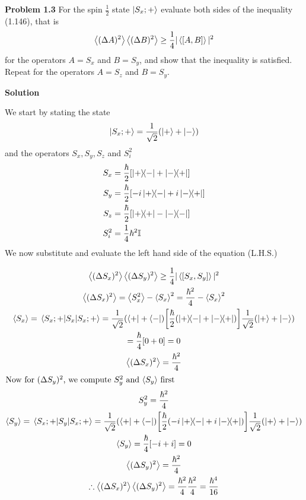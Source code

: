 \item \textbf{Problem 1.3}
For the spin $\frac12$ state $\ket{S_x;+}$ evaluate both sides of the inequality (1.146), that is
$$ \ev{(\Delta A)^2} \ev{(\Delta B)^2} \geq \frac14 |\ev{\comm{A}{B}}|^2$$
for the operators $A = S_x$ and $B = S_y$, and show that the inequality is satisfied. Repeat for the operators $A = S_z$ and $B = S_y$.

\vspace{1cm}
\textbf{Solution}

We start by stating the state $$\ket{S_x;+} = \frac{1}{\sqrt{2}} \qty(\ket + + \ket -)$$ and the operators $S_x,S_y,S_z$ and $S_i^2$
\begin{align*}
	S_x   & = \frac{\hbar}{2} \qty[\op{+}{-} + \ketbra{-}{+}]    \\
	S_y   & = \frac{\hbar}{2} \qty[-i\op{+}{-} + i\ketbra{-}{+}] \\
	S_z   & = \frac{\hbar}{2} \qty[\op{+}{+} - \ketbra{-}]       \\
	S_i^2 & = \frac14 \hbar^2\mathbb{I}
\end{align*}
We now substitute and evaluate the left hand side of the equation (L.H.S.)

\begin{gather*}
	\ev{(\Delta S_x)^2}\ev{(\Delta S_y)^2} \ge \frac{1}{4} | \ev{\comm{S_x}{S_y}} |^2\\
	\ev{(\Delta S_x)^2} = \ev{S_x^2} - \ev{S_x}^2 = \frac{\hbar^2}{4} - \ev{S_x}^2\\
	\ev{S_x} = \ev{S_x}{S_x;+} = \frac{1}{\sqrt{2}} \qty(\bra + + \bra -) \qty[\frac{\hbar}{2} \qty(\op{+}{-} + \ketbra{-}{+})]\frac{1}{\sqrt{2}} \qty(\ket + + \ket -)\\
	= \frac\hbar4 \qty[0 + 0] = 0\\
	\ev{(\Delta S_x)^2} = \frac{\hbar^2}{4}\\
	\intertext{Now for $(\Delta S_y)^2$, we compute $S_y^2$ and $\ev{S_y}$ first}
	S_y^2 = \frac{\hbar^2}{4}\\
	\ev{S_y} = \ev{S_y}{S_x;+} =  \frac{1}{\sqrt{2}} \qty(\bra + + \bra -) \qty[\frac{\hbar}{2} \qty(-i\op{+}{-} + i\ketbra{-}{+})]\frac{1}{\sqrt{2}} \qty(\ket + + \ket -)\\
	\ev{S_y}= \frac{\hbar}{4} \qty[-i+i] = 0 \\
	\ev{(\Delta S_y)^2} = \frac{\hbar^2}{4}\\
	\therefore \ev{(\Delta S_x)^2}\ev{(\Delta S_y)^2} = \frac{\hbar^2}{4}\frac{\hbar^2}{4} = \frac{\hbar^4}{16}
\end{gather*}


